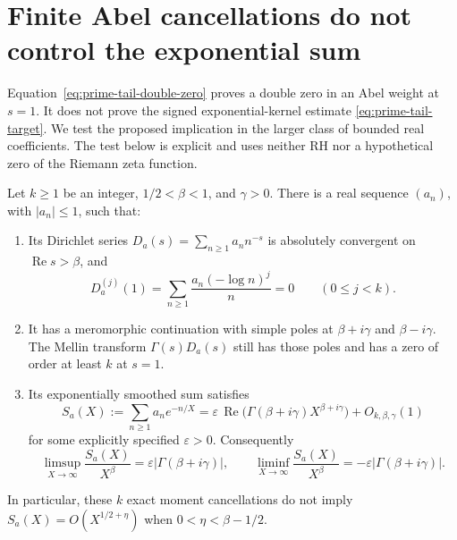 \section{Finite Abel cancellations do not control the exponential sum}
\label{app:abel-obstruction}

Equation~\eqref{eq:prime-tail-double-zero} proves a double zero in
an Abel weight at \(s=1\). It does not prove the signed
exponential-kernel estimate \eqref{eq:prime-tail-target}. We test
the proposed implication in the larger class of bounded real
coefficients. The test below is explicit and uses neither RH
nor a hypothetical zero of the Riemann zeta function.

\begin{theorem}
\label{thm:abel-obstruction}
Let \(k\ge1\) be an integer, \(1/2<\beta<1\), and \(\gamma>0\).
There is a real sequence \((a_n)\), with \(|a_n|\le1\), such that:
\begin{enumerate}
\item Its Dirichlet series \(D_a(s)=\sum_{n\ge1}a_nn^{-s}\)
  is absolutely convergent on \(\operatorname{Re}s>\beta\), and
  \[
   D_a^{(j)}(1)=
      \sum_{n\ge1}\frac{a_n(-\log n)^j}{n}=0
        \qquad(0\le j<k).
  \]
\item It has a meromorphic continuation with simple poles at
  \(\beta+i\gamma\) and \(\beta-i\gamma\). The Mellin transform
  \(\Gamma(s)D_a(s)\) still has those poles and has a zero of
  order at least \(k\) at \(s=1\).
\item Its exponentially smoothed sum satisfies
  \[
   S_a(X):=\sum_{n\ge1}a_ne^{-n/X}
    =\varepsilon\,\operatorname{Re}
        \bigl(\Gamma(\beta+i\gamma)X^{\beta+i\gamma}\bigr)
       +O_{k,\beta,\gamma}(1)
  \]
  for some explicitly specified \(\varepsilon>0\).
  Consequently
  \[
   \limsup_{X\to\infty}\frac{S_a(X)}{X^\beta}
       =\varepsilon|\Gamma(\beta+i\gamma)|,\qquad
   \liminf_{X\to\infty}\frac{S_a(X)}{X^\beta}
       =-\varepsilon|\Gamma(\beta+i\gamma)|.
  \]
\end{enumerate}
In particular, these \(k\) exact moment cancellations do not imply
\(S_a(X)=O(X^{1/2+\eta})\) when \(0<\eta<\beta-1/2\).
\end{theorem}

